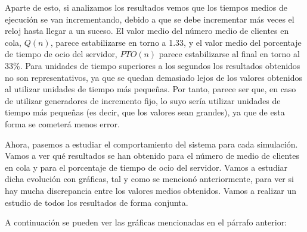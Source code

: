 \documentclass[11pt,a4paper]{article}
\begin{document}
Aparte de esto, si analizamos los resultados vemos que los tiempos medios de ejecución
se van incrementando, debido a que se debe incrementar más veces el reloj hasta
llegar a un suceso. El valor medio del número medio de clientes en cola, $Q(n)$, parece
estabilizarse en torno a 1.33, y el valor medio del porcentaje de tiempo de ocio
del servidor, $PTO(n)$ parece estabilizarse al final en torno al 33\%. Para unidades
de tiempo superiores a los segundos los resultados obtenidos no son representativos,
ya que se quedan demasiado lejos de los valores obtenidos al utilizar unidades
de tiempo más pequeñas. Por tanto, parece ser que, en caso de utilizar generadores
de incremento fijo, lo suyo sería utilizar unidades de tiempo más pequeñas (es decir,
que los valores sean grandes), ya que de esta forma se cometerá menos error.

Ahora, pasemos a estudiar el comportamiento del sistema para cada simulación.
Vamos a ver qué resultados se han obtenido para el número de medio de clientes
en cola y para el porcentaje de tiempo de ocio del servidor. Vamos a estudiar
dicha evolución con gráficas, tal y como se mencionó anteriormente, para ver
si hay mucha discrepancia entre los valores medios obtenidos. Vamos a realizar
un estudio de todos los resultados de forma conjunta.

A continuación se pueden ver las gráficas mencionadas en el párrafo anterior:
\end{document}
